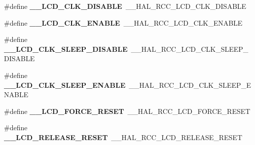 \begin{DoxyCompactItemize}
\item 
\hypertarget{group___h_a_l___r_c_c___aliased_ga00955b2f1f6c5709acc566689563e727}{\#define {\bfseries \-\_\-\-\_\-\-L\-C\-D\-\_\-\-C\-L\-K\-\_\-\-D\-I\-S\-A\-B\-L\-E}~\-\_\-\-\_\-\-H\-A\-L\-\_\-\-R\-C\-C\-\_\-\-L\-C\-D\-\_\-\-C\-L\-K\-\_\-\-D\-I\-S\-A\-B\-L\-E}\label{group___h_a_l___r_c_c___aliased_ga00955b2f1f6c5709acc566689563e727}

\item 
\hypertarget{group___h_a_l___r_c_c___aliased_ga5719fad27a70ec9e4512bb6fa8df1148}{\#define {\bfseries \-\_\-\-\_\-\-L\-C\-D\-\_\-\-C\-L\-K\-\_\-\-E\-N\-A\-B\-L\-E}~\-\_\-\-\_\-\-H\-A\-L\-\_\-\-R\-C\-C\-\_\-\-L\-C\-D\-\_\-\-C\-L\-K\-\_\-\-E\-N\-A\-B\-L\-E}\label{group___h_a_l___r_c_c___aliased_ga5719fad27a70ec9e4512bb6fa8df1148}

\item 
\hypertarget{group___h_a_l___r_c_c___aliased_ga16ae30997238082c03c1ba2dd42736d4}{\#define {\bfseries \-\_\-\-\_\-\-L\-C\-D\-\_\-\-C\-L\-K\-\_\-\-S\-L\-E\-E\-P\-\_\-\-D\-I\-S\-A\-B\-L\-E}~\-\_\-\-\_\-\-H\-A\-L\-\_\-\-R\-C\-C\-\_\-\-L\-C\-D\-\_\-\-C\-L\-K\-\_\-\-S\-L\-E\-E\-P\-\_\-\-D\-I\-S\-A\-B\-L\-E}\label{group___h_a_l___r_c_c___aliased_ga16ae30997238082c03c1ba2dd42736d4}

\item 
\hypertarget{group___h_a_l___r_c_c___aliased_ga4e3f32f549a41a5d9e4afb607bb61593}{\#define {\bfseries \-\_\-\-\_\-\-L\-C\-D\-\_\-\-C\-L\-K\-\_\-\-S\-L\-E\-E\-P\-\_\-\-E\-N\-A\-B\-L\-E}~\-\_\-\-\_\-\-H\-A\-L\-\_\-\-R\-C\-C\-\_\-\-L\-C\-D\-\_\-\-C\-L\-K\-\_\-\-S\-L\-E\-E\-P\-\_\-\-E\-N\-A\-B\-L\-E}\label{group___h_a_l___r_c_c___aliased_ga4e3f32f549a41a5d9e4afb607bb61593}

\item 
\hypertarget{group___h_a_l___r_c_c___aliased_gac78590e594ded3821d92f4a6fbd623bc}{\#define {\bfseries \-\_\-\-\_\-\-L\-C\-D\-\_\-\-F\-O\-R\-C\-E\-\_\-\-R\-E\-S\-E\-T}~\-\_\-\-\_\-\-H\-A\-L\-\_\-\-R\-C\-C\-\_\-\-L\-C\-D\-\_\-\-F\-O\-R\-C\-E\-\_\-\-R\-E\-S\-E\-T}\label{group___h_a_l___r_c_c___aliased_gac78590e594ded3821d92f4a6fbd623bc}

\item 
\hypertarget{group___h_a_l___r_c_c___aliased_ga93aaa79e2c11077ea32d96e01e64adeb}{\#define {\bfseries \-\_\-\-\_\-\-L\-C\-D\-\_\-\-R\-E\-L\-E\-A\-S\-E\-\_\-\-R\-E\-S\-E\-T}~\-\_\-\-\_\-\-H\-A\-L\-\_\-\-R\-C\-C\-\_\-\-L\-C\-D\-\_\-\-R\-E\-L\-E\-A\-S\-E\-\_\-\-R\-E\-S\-E\-T}\label{group___h_a_l___r_c_c___aliased_ga93aaa79e2c11077ea32d96e01e64adeb}


\end{DoxyCompactItemize}
